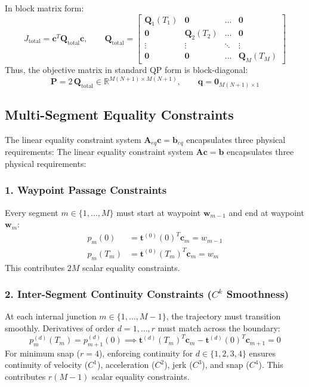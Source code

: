 \documentclass[11pt,a4paper]{article}
\begin{document}
In block matrix form:
\begin{equation}
J_{\text{total}} = \mathbf{c}^T \mathbf{Q}_{\text{total}} \mathbf{c}, \qquad
\mathbf{Q}_{\text{total}} = \begin{bmatrix}
\mathbf{Q}_1(T_1) & \mathbf{0} & \dots & \mathbf{0} \\
\mathbf{0} & \mathbf{Q}_2(T_2) & \dots & \mathbf{0} \\
\vdots & \vdots & \ddots & \vdots \\
\mathbf{0} & \mathbf{0} & \dots & \mathbf{Q}_M(T_M)
\end{bmatrix}
\end{equation}
Thus, the objective matrix in standard QP form is block-diagonal:
\begin{equation}
\mathbf{P} = 2 \, \mathbf{Q}_{\text{total}} \in \mathbb{R}^{M(N+1) \times M(N+1)}, \qquad \mathbf{q} = \mathbf{0}_{M(N+1) \times 1}
\end{equation}

\subsection{Multi-Segment Equality Constraints}

The linear equality constraint system $\mathbf{A}_{eq} \mathbf{c} = \mathbf{b}_{eq}$ encapsulates three physical requirements:
The linear equality constraint system $\mathbf{A} \mathbf{c} = \mathbf{b}$ encapsulates three physical requirements:

\subsubsection{1. Waypoint Passage Constraints}
Every segment $m \in \{1, \dots, M\}$ must start at waypoint $\mathbf{w}_{m-1}$ and end at waypoint $\mathbf{w}_m$:
\begin{align}
p_m(0) &= \mathbf{t}^{(0)}(0)^T \mathbf{c}_m = w_{m-1} \\
p_m(T_m) &= \mathbf{t}^{(0)}(T_m)^T \mathbf{c}_m = w_m
\end{align}
This contributes $2M$ scalar equality constraints.

\subsubsection{2. Inter-Segment Continuity Constraints (\texorpdfstring{$C^k$}{C\textasciicircum k} Smoothness)}
At each internal junction $m \in \{1, \dots, M-1\}$, the trajectory must transition smoothly. Derivatives of order $d = 1, \dots, r$ must match across the boundary:
\begin{equation}
p_m^{(d)}(T_m) = p_{m+1}^{(d)}(0)
\implies
\mathbf{t}^{(d)}(T_m)^T \mathbf{c}_m - \mathbf{t}^{(d)}(0)^T \mathbf{c}_{m+1} = 0
\end{equation}
For minimum snap ($r=4$), enforcing continuity for $d \in \{1, 2, 3, 4\}$ ensures continuity of velocity ($C^1$), acceleration ($C^2$), jerk ($C^3$), and snap ($C^4$). This contributes $r(M-1)$ scalar equality constraints.
\end{document}
